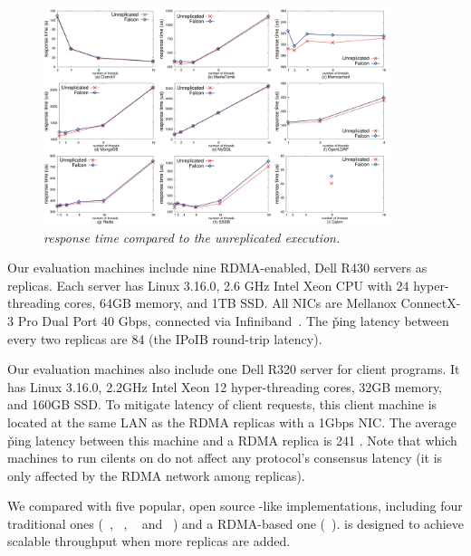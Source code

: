 \begin{figure}[t]
\centering
\includegraphics[width=0.9\textwidth]{figures/latency}
\vspace{-.10in}
\caption{\small {\em \xxx response time compared to the unreplicated
execution.}}
\vspace{-.20in}
\label{fig:latency}
\end{figure}

Our evaluation machines include nine RDMA-enabled, Dell R430 servers as \paxos 
replicas. Each server has Linux 3.16.0, 2.6 GHz Intel Xeon CPU with 24 
hyper-threading cores, 64GB memory, and 1TB SSD. All NICs are Mellanox 
ConnectX-3 Pro Dual Port 40 Gbps, connected via Infiniband~\cite{infiniband}. 
The \v{ping} latency between every two replicas are 84 \us (the IPoIB 
round-trip latency).
%

Our evaluation machines also include one Dell R320 server for client programs. 
It has Linux 3.16.0, 2.2GHz Intel Xeon 12 hyper-threading cores, 32GB memory, 
and 160GB SSD. To mitigate latency of client requests, this client machine is 
located at the same LAN as the RDMA replicas with a 1Gbps NIC. The average 
\v{ping} latency between this machine and a RDMA replica is 241 \us. Note that 
which machines to run cilents on do not affect any \paxos protocol's consensus 
latency (it is only affected by the RDMA network among replicas).


We compared \xxx with five popular, open source \paxos-like implementations,
including four traditional ones (\libpaxos~\cite{libpaxos},
\zookeeper~\cite{zookeeper}, \crane~\cite{crane:sosp15} and
\spaxos~\cite{spaxos}) and a RDMA-based one (\dare~\cite{dare:hpdc15}). \spaxos
is designed to achieve scalable throughput when more replicas are added. 

